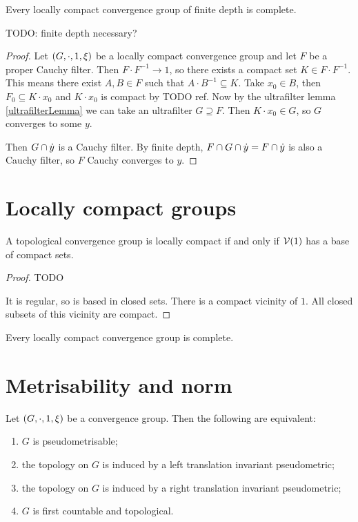 \begin{proposition}
Every locally compact convergence group of finite depth is complete.
\end{proposition}
TODO: finite depth necessary?
\begin{proof}
Let $\left( G, \cdot, 1, \xi \right)$ be a locally compact convergence group and let $F$ be a proper Cauchy filter. Then $F\cdot F^{-1} \to 1$, so there exists a compact set $K\in F\cdot F^{-1}$. This means there exist $A, B \in F$ such that $A\cdot B^{-1} \subseteq K$. Take $x_0 \in B$, then $F_0 \subseteq K\cdot x_0$ and $K\cdot x_0$ is compact by TODO ref. Now by the ultrafilter lemma \ref{ultrafilterLemma} we can take an ultrafilter $G \supseteq F$. Then $K\cdot x_0 \in G$, so $G$ converges to some $y$.

Then $G \cap \dot{y}$ is a Cauchy filter. By finite depth, $F\cap G \cap \dot{y} = F\cap \dot{y}$ is also a Cauchy filter, so $F$ Cauchy converges to $y$.
\end{proof}

\section{Locally compact groups}
\begin{lemma}
A topological convergence group is locally compact \textup{if and only if} $\operatorname{\mathcal{V}}(1)$ has a base of compact sets.
\end{lemma}
\begin{proof}
TODO 

It is regular, so is based in closed sets. There is a compact vicinity of $1$. All closed subsets of this vicinity are compact.
\end{proof}

\begin{proposition}
Every locally compact convergence group is complete.
\end{proposition}

\section{Metrisability and norm}

\begin{theorem}
Let $\left( G,\cdot, 1, \xi \right)$ be a convergence group. Then the following are equivalent:
\begin{enumerate}
\item $G$ is pseudometrisable;
\item the topology on $G$ is induced by a left translation invariant pseudometric;
\item the topology on $G$ is induced by a right translation invariant pseudometric;
\item $G$ is first countable and topological.
\end{enumerate}
\end{theorem}

